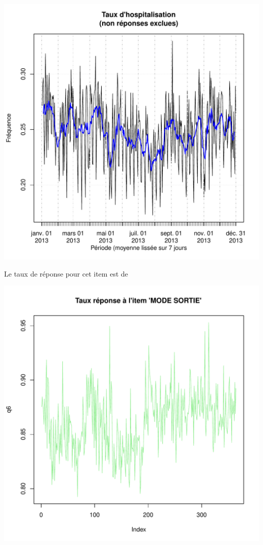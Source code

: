 \documentclass[12pt,english,french,twoside]{book}\usepackage[]{graphicx}\usepackage[]{color}
\makeatletter
\def\maxwidth{ %
  \ifdim\Gin@nat@width>\linewidth
    \linewidth
  \else
    \Gin@nat@width
  \fi
}
\makeatother
\begin{document}
\includegraphics[width=\maxwidth]{figure/hospit-1} 



Le taux de réponse pour cet item est de

\includegraphics[width=\maxwidth]{figure/retour_dom3-1} 
\end{document}
